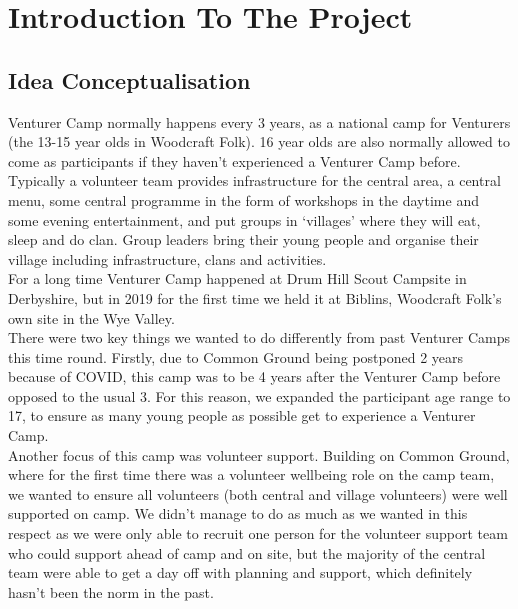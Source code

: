 \chapter{Introduction To The Project}
\section{Idea Conceptualisation}
Venturer Camp normally happens every 3 years, as a national camp for Venturers (the 13-15 year olds in Woodcraft Folk). 16 year olds are also normally allowed to come as participants if they haven't experienced a Venturer Camp before.\\

Typically a volunteer team provides infrastructure for the central area, a central menu, some central programme in the form of workshops in the daytime and some evening entertainment, and put groups in `villages' where they will eat, sleep and do clan. Group leaders bring their young people and organise their village including infrastructure, clans and activities.\\

For a long time Venturer Camp happened at Drum Hill Scout Campsite in Derbyshire, but in 2019 for the first time we held it at Biblins, Woodcraft Folk's own site in the Wye Valley. \\

There were two key things we wanted to do differently from past Venturer Camps this time round. Firstly, due to Common Ground being postponed 2 years because of COVID, this camp was to be 4 years after the Venturer Camp before opposed to the usual 3. For this reason, we expanded the participant age range to 17, to ensure as many young people as possible get to experience a Venturer Camp. \\

Another focus of this camp was volunteer support. Building on Common Ground, where for the first time there was a volunteer wellbeing role on the camp team, we wanted to ensure all volunteers (both central and village volunteers) were well supported on camp. We didn't manage to do as much as we wanted in this respect as we were only able to recruit one person for the volunteer support team who could support ahead of camp and on site, but the majority of the central team were able to get a day off with planning and support, which definitely hasn't been the norm in the past.

